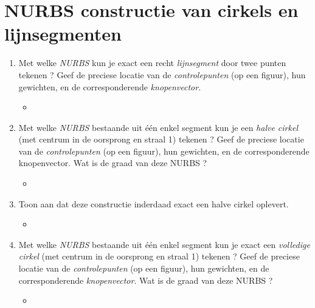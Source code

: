 \documentclass{report}
\newcommand{\vraag}[2]{
	\item #1
	
	#2
}
\begin{document}
	\section{NURBS constructie van cirkels en lijnsegmenten  }
	\begin{enumerate}
		\vraag{Met welke \textit{NURBS} kun je exact een recht \textit{lijnsegment} door twee punten tekenen ? Geef de preciese locatie van de \textit{controlepunten} (op een figuur), hun gewichten, en de corresponderende \textit{knopenvector}.}{\begin{itemize} \item {} \end{itemize}}
		
		\vraag{Met welke \textit{NURBS} bestaande uit één enkel segment kun je een \textit{halve cirkel} (met centrum in de oorsprong en straal 1) tekenen ? Geef de preciese locatie van de \textit{controlepunten} (op een figuur), hun gewichten, en de corresponderende knopenvector\textit{}. Wat is de graad van deze NURBS ?}{\begin{itemize} \item {} \end{itemize}}
		
		\vraag{Toon aan dat deze constructie inderdaad exact een halve cirkel oplevert.}{\begin{itemize} \item {} \end{itemize}}
		
		\vraag{Met welke \textit{NURBS} bestaande uit één enkel segment kun je exact een \textit{volledige cirkel} (met centrum in de oorsprong en straal 1) tekenen ? Geef de preciese locatie van de \textit{controlepunten} (op een figuur), hun gewichten, en de corresponderende \textit{knopenvector}. Wat is de graad van deze NURBS ?}{\begin{itemize} \item \todo{oplossen} \end{itemize}}
	\end{enumerate}
\end{document}
